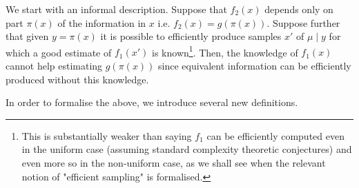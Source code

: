 \documentclass{article}
\theoremstyle{definition}
\theoremstyle{plain}
\begin{document}
We start with an informal description. Suppose that $f_2(x)$ depends only on part $\pi(x)$ of the information in $x$ i.e. $f_2(x) = g(\pi(x))$. Suppose further that given $y=\pi(x)$ it is possible to efficiently produce samples $x'$ of $\mu \mid y$ for which a good estimate of $f_1(x')$ is known\footnote{This is substantially weaker than saying $f_1$ can be efficiently computed even in the uniform case (assuming standard complexity theoretic conjectures) and even more so in the non-uniform case, as we shall see when the relevant notion of "efficient sampling" is formalised.}. Then, the knowledge of $f_1(x)$ cannot help estimating $g(\pi(x))$ since equivalent information can be efficiently produced without this knowledge.

In order to formalise the above, we introduce several new definitions.
\end{document}
